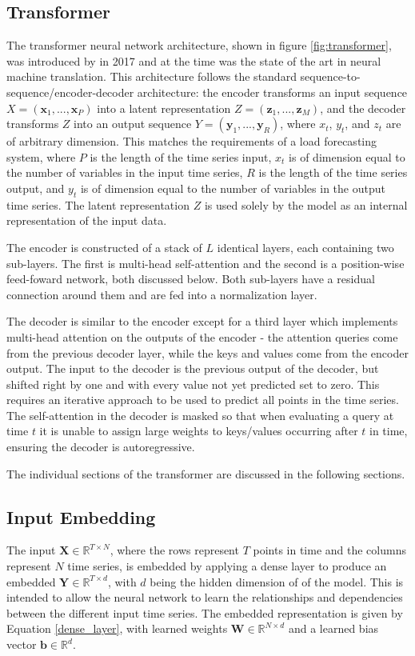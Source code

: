 \documentclass[conference]{IEEEtran}
\begin{document}
\subsection{Transformer}
The transformer neural network architecture, shown in figure \ref{fig:transformer}, was introduced by \cite{Vaswani2017} in 2017 and at the time was the state of the art in neural machine translation.
This architecture follows the standard sequence-to-sequence/encoder-decoder architecture: the encoder transforms an input sequence $X = (\boldsymbol{x}_1, ..., \boldsymbol{x}_P)$ into a latent representation $Z = (\boldsymbol{z}_1, ..., \boldsymbol{z}_M)$, and the decoder transforms $Z$ into an output sequence $Y = (\boldsymbol{y}_1, ..., \boldsymbol{y}_R)$, where $x_t$, $y_t$, and $z_t$ are of arbitrary dimension.
This matches the requirements of a load forecasting system, where $P$ is the length of the time series input, $x_t$ is of dimension equal to the number of variables in the input time series, $R$ is the length of the time series output, and $y_t$ is of dimension equal to the number of variables in the output time series.
The latent representation $Z$ is used solely by the model as an internal representation of the input data.

The encoder is constructed of a stack of $L$ identical layers, each containing two sub-layers.
The first is multi-head self-attention and the second is a position-wise feed-foward network, both discussed below.
Both sub-layers have a residual connection around them and are fed into a normalization layer.

The decoder is similar to the encoder except for a third layer which implements multi-head attention on the outputs of the encoder - the attention queries come from the previous decoder layer, while the keys and values come from the encoder output.
The input to the decoder is the previous output of the decoder, but shifted right by one and with every value not yet predicted set to zero.
This requires an iterative approach to be used to predict all points in the time series.
The self-attention in the decoder is masked so that when evaluating a query at time $t$ it is unable to assign large weights to keys/values occurring after $t$ in time, ensuring the decoder is autoregressive.

The individual sections of the transformer are discussed in the following sections.

\subsection{Input Embedding}
The input $\boldsymbol{X} \in \mathbb{R}^{T \times N}$, where the rows represent $T$ points in time and the columns represent $N$ time series, is embedded by applying a dense layer to produce an embedded $\boldsymbol{Y} \in \mathbb{R}^{T \times d}$, with $d$ being the hidden dimension of of the model.
This is intended to allow the neural network to learn the relationships and dependencies between the different input time series.
The embedded representation is given by Equation \ref{dense_layer}, with learned weights $\boldsymbol{W} \in \mathbb{R}^{N \times d}$ and a learned bias vector $\boldsymbol{b} \in \mathbb{R}^{d}$.
\end{document}
